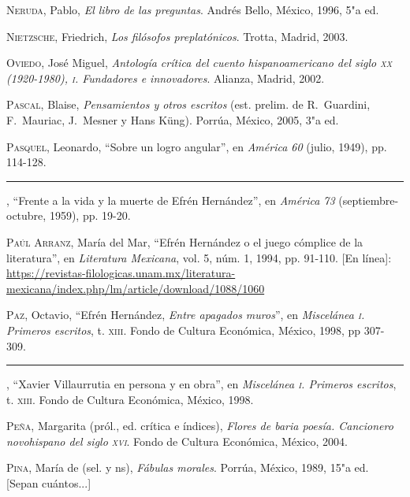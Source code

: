 \documentclass[14pt,twoside,final]{extbook} %
\begin{document}
\textsc{Neruda}, Pablo, \emph{El libro de las preguntas}. Andrés Bello, México, 1996, 5"a ed.\label{bib:neruda1996}

\textsc{Nietzsche}, Friedrich, \emph{Los filósofos preplatónicos}. Trotta, Madrid, 2003.\label{bib:nietzche2003}

\textsc{Oviedo}, José Miguel, \emph{Antología crítica del cuento hispanoamericano del siglo \textsc{xx} (1920-1980), \textsc{i}. Fundadores e innovadores}. Alianza, Madrid, 2002.\label{bib:oviedo2002}

\textsc{Pascal}, Blaise, \emph{Pensamientos y otros escritos} (est. prelim. de R.~Guardini, F.~Mauriac, J.~Mesner y Hans Küng). Porrúa, México, 2005, 3"a ed.

\textsc{Pasquel}, Leonardo, ``Sobre un logro angular'', en \emph{América 60} (julio, 1949), pp. 114-128.\label{bib:pasquel1949}

\rule{1cm}{0.4pt}, ``Frente a la vida y la muerte de Efrén Hernández'', en \emph{América 73} (septiembre-octubre, 1959), pp. 19-20.\label{bib:pasquel1959}

\textsc{Paúl Arranz}, María del Mar, ``Efrén Hernández o el juego cómplice de la literatura'', en \emph{Literatura Mexicana}, vol. 5, núm. 1, 1994, pp. 91-110. [En línea]: \url{https://revistas-filologicas.unam.mx/literatura-mexicana/index.php/lm/article/download/1088/1060}\label{bib:paul1994}

\textsc{Paz}, Octavio, ``Efrén Hernández, \emph{Entre apagados muros}'', en \emph{Miscelánea \textsc{i}. Primeros escritos}, t. \textsc{xiii}. Fondo de Cultura Económica, México, 1998, pp 307-309.\label{bib:paz1998a}

\rule{1cm}{0.4pt}, ``Xavier Villaurrutia en persona y en obra'', en \emph{Miscelánea \textsc{i}. Primeros escritos}, t. \textsc{xiii}. Fondo de Cultura Económica, México, 1998.\label{bib:paz1998b}

\textsc{Peña}, Margarita (pról., ed. crítica e índices), \emph{Flores de baria poesía. Cancionero novohispano del siglo \textsc{xvi}}. Fondo de Cultura Económica, México, 2004.\label{bib:peña2004}

\textsc{Pina}, María de (sel. y ns), \emph{Fábulas morales}. Porrúa, México, 1989, 15"a ed. [Sepan cuántos...]\label{bib:pina1989}
\end{document}
